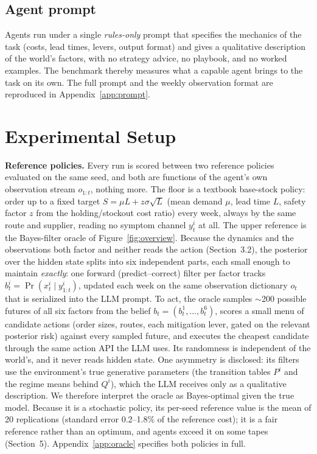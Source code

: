\documentclass{article}
\begin{document}
\subsection{Agent prompt}

Agents run under a single \emph{rules-only} prompt that specifies the
mechanics of the task (costs, lead times, levers, output format) and gives
a qualitative description of the world's factors, with no strategy advice,
no playbook, and no worked examples. The benchmark thereby measures what a
capable agent brings to the task on its own. The full
prompt and the weekly observation format are reproduced in
Appendix~\ref{app:prompt}.

\section{Experimental Setup}

\textbf{Reference policies.} Every run is scored between two reference
policies evaluated on the same seed, and both are functions of the agent's
own observation stream $o_{1:t}$, nothing more. The floor is a textbook
base-stock policy: order up to a fixed target $S = \mu L +
z\sigma\sqrt{L}$ (mean demand $\mu$, lead time $L$, safety factor $z$ from
the holding/stockout cost ratio) every week, always by the same route and
supplier, reading no symptom channel $y_t^i$ at all. The upper reference
is the Bayes-filter oracle of Figure~\ref{fig:overview}. Because the
dynamics and the observations both factor and neither reads the action
(Section~3.2), the posterior over the hidden state splits into six
independent parts, each small enough to maintain \emph{exactly}: one
forward (predict--correct) filter per factor tracks
$b_t^i = \Pr(x_t^i \mid y_{1:t}^i)$, updated each week on the same
observation dictionary $o_t$ that is serialized into the LLM prompt. To act, the oracle samples $\sim$200 possible futures of
all six factors from the belief $b_t = (b_t^1, \dots, b_t^6)$, scores a
small menu of candidate actions (order sizes, routes, each mitigation
lever, gated on the relevant posterior risk) against every sampled future,
and executes the cheapest candidate through the same action API the LLM
uses. Its randomness is independent of the world's, and it never reads
hidden state. One asymmetry is disclosed: its filters use the
environment's true generative parameters (the transition tables $P^i$ and
the regime means behind $Q^i$), which the LLM receives only as a
qualitative description. We
therefore interpret the oracle as Bayes-optimal given the true model.
Because it is a stochastic policy, its per-seed reference value is the mean
of 20 replications (standard error 0.2--1.8\% of the reference cost); it is
a fair reference rather than an optimum, and agents exceed it on some tapes
(Section~5).
Appendix~\ref{app:oracle} specifies both policies in full.
\end{document}
